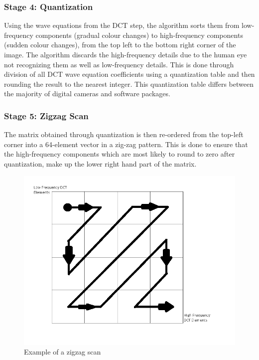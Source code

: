 \subsubsection{Stage 4: Quantization}
Using the wave equations from the DCT step,
the algorithm sorts them from low-frequency
components (gradual colour changes) to 
high-frequency components (sudden colour changes),
from the top left to the bottom right corner of the image.
The algorithm discards the high-frequency details
due to the human eye not recognizing them as
well as low-frequency details. This is done through 
division of all DCT wave equation 
coefficients using a quantization table and
then rounding the result to the nearest integer.
This quantization table differs between
the majority of digital cameras and 
software packages\cite{hass_impulse_jpeg}.

\subsubsection{Stage 5: Zigzag Scan}
The matrix obtained through quantization is
then re-ordered from the top-left corner into a 
64-element vector in a zig-zag pattern.
This is done to ensure that the high-frequency
components which are most likely to round to
zero after quantization, make up the lower
right hand part of the matrix.

\begin{figure}[!hbtp]
\begin{center}
\includegraphics[width=1.0\textwidth]{figures/jpegzigzag.png} 
\end{center}
\caption{Example of a zigzag scan \cite{hass_impulse_jpeg}}
\end{figure}

